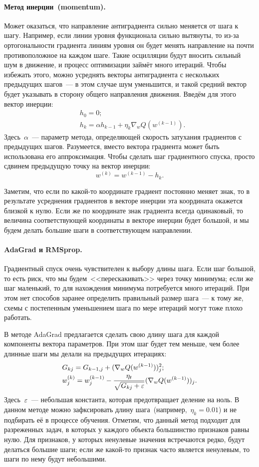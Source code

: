 \documentclass[12pt,fleqn]{article}
\begin{document}
\paragraph{Метод инерции~(momentum).}
Может оказаться, что направление антиградиента сильно меняется от шага к шагу.
Например, если линии уровня функционала сильно вытянуты, то из-за ортогональности градиента линиям уровня
он будет менять направление на почти противоположное на каждом шаге.
Такие осцилляции будут вносить сильный шум в движение, и процесс оптимизации займёт много итераций.
Чтобы избежать этого, можно усреднять векторы антиградиента с нескольких предыдущих шагов~--- в этом
случае шум уменьшится, и такой средний вектор будет указывать в сторону общего направления движения.
Введём для этого вектор инерции:
\begin{align*}
    &h_0 = 0;\\
    &h_k = \alpha h_{k - 1} + \eta_k \nabla_w Q(w^{(k-1)}).
\end{align*}
Здесь~$\alpha$~--- параметр метода, определяющей скорость затухания градиентов с предыдущих шагов.
Разумеется, вместо вектора градиента может быть использована его аппроксимация.
Чтобы сделать шаг градиентного спуска, просто сдвинем предыдущую точку на вектор инерции:
\[
    w^{(k)} = w^{(k-1)} - h_k.
\]

Заметим, что если по какой-то координате градиент постоянно меняет знак, то в результате усреднения
градиентов в векторе инерции эта координата окажется близкой к нулю.
Если же по координате знак градиента всегда одинаковый, то величина соответствующей координаты
в векторе инерции будет большой, и мы будем делать большие шаги в соответствующем направлении.

\paragraph{AdaGrad и RMSprop.}
Градиентный спуск очень чувствителен к выбору длины шага.
Если шаг большой, то есть риск, что мы будем~<<перескакивать>> через точку минимума;
если же шаг маленький, то для нахождения минимума потребуется много итераций.
При этом нет способов заранее определить правильный размер шага~--- к тому же,
схемы с постепенным уменьшением шага по мере итераций могут тоже плохо работать.

В методе AdaGrad предлагается сделать свою длину шага для каждой компоненты вектора параметров.
При этом шаг будет тем меньше, чем более длинные шаги мы делали на предыдущих итерациях:
\begin{align*}
    &G_{kj} = G_{k-1,j} + (\nabla_w Q(w^{(k-1)}))_j^2;\\
    &w_j^{(k)} = w_j^{(k-1)} - \frac{\eta_t}{\sqrt{G_{kj} + \varepsilon}} (\nabla_w Q(w^{(k-1)}))_j.
\end{align*}
Здесь~$\varepsilon$~--- небольшая константа, которая предотвращает деление на ноль.
В данном методе можно зафксировать длину шага~(например,~$\eta_k = 0.01$)
и не подбирать её в процессе обучения.
Отметим, что данный метод подходит для разреженных задач, в которых у каждого объекта большинство признаков равны нулю.
Для признаков, у которых ненулевые значения встречаются редко, будут делаться большие шаги;
если же какой-то признак часто является ненулевым, то шаги по нему будут небольшими.
\end{document}
